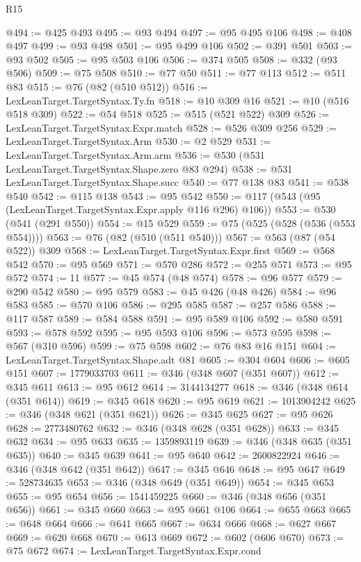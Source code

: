 \begin{lexlean}{R15}
\begin{coremodule}
{{{{{{{{{{{{{{{{{{{{{{{{{{{{{{{{{{{{{{{{{{{{{{{{{{{{{{{{{{{{{{{{{{{{{{@494 := @425 @493
@495 := @93 @494
@497 := @95 @495 @106
@498 := @408 @497
@499 := @93 @498
@501 := @95 @499 @106
@502 := @391 @501
@503 := @93 @502
@505 := @95 @503 @106
@506 := @374 @505
@508 := @332 (@93 @506)
@509 := @75 @508
@510 := @77 @50
@511 := @77 @113
@512 := @511 @83
@515 := @76 (@82 (@510 @512))
@516 := LexLeanTarget.TargetSyntax.Ty.fn
@518 := @10 @309 @16
@521 := @10 (@516 @518 @309)
@522 := @54 @518
@525 := @515 (@521 @522) @309
@526 := LexLeanTarget.TargetSyntax.Expr.match
@528 := @526 @309 @256
@529 := LexLeanTarget.TargetSyntax.Arm
@530 := @2 @529
@531 := LexLeanTarget.TargetSyntax.Arm.arm
@536 := @530 (@531 LexLeanTarget.TargetSyntax.Shape.zero @83 @294)
@538 := @531 LexLeanTarget.TargetSyntax.Shape.succ
@540 := @77 @138 @83
@541 := @538 @540
@542 := @115 @138
@543 := @95 @542
@550 := @117 (@543 (@95 (LexLeanTarget.TargetSyntax.Expr.apply @116 @296) @106))
@553 := @530 (@541 (@291 @550))
@554 := @15 @529
@559 := @75 (@525 (@528 (@536 (@553 @554))))
@563 := @76 (@82 (@510 (@511 @540)))
@567 := @563 (@87 (@54 @522)) @309
@568 := LexLeanTarget.TargetSyntax.Expr.first
@569 := @568 @542
@570 := @95 @569
@571 := @570 @286
@572 := @255 @571
@573 := @95 @572
@574 := 11
@577 := @45 @574 (@48 @574)
@578 := @96 @577
@579 := @290 @542
@580 := @95 @579
@583 := @45 @426 (@48 @426)
@584 := @96 @583
@585 := @570 @106
@586 := @295 @585
@587 := @257 @586
@588 := @117 @587
@589 := @584 @588
@591 := @95 @589 @106
@592 := @580 @591
@593 := @578 @592
@595 := @95 @593 @106
@596 := @573 @595
@598 := @567 (@310 @596)
@599 := @75 @598
@602 := @76 @83 @16 @151
@604 := LexLeanTarget.TargetSyntax.Shape.adt @81
@605 := @304 @604
@606 := @605 @151
@607 := 1779033703
@611 := @346 (@348 @607 (@351 @607))
@612 := @345 @611
@613 := @95 @612
@614 := 3144134277
@618 := @346 (@348 @614 (@351 @614))
@619 := @345 @618
@620 := @95 @619
@621 := 1013904242
@625 := @346 (@348 @621 (@351 @621))
@626 := @345 @625
@627 := @95 @626
@628 := 2773480762
@632 := @346 (@348 @628 (@351 @628))
@633 := @345 @632
@634 := @95 @633
@635 := 1359893119
@639 := @346 (@348 @635 (@351 @635))
@640 := @345 @639
@641 := @95 @640
@642 := 2600822924
@646 := @346 (@348 @642 (@351 @642))
@647 := @345 @646
@648 := @95 @647
@649 := 528734635
@653 := @346 (@348 @649 (@351 @649))
@654 := @345 @653
@655 := @95 @654
@656 := 1541459225
@660 := @346 (@348 @656 (@351 @656))
@661 := @345 @660
@663 := @95 @661 @106
@664 := @655 @663
@665 := @648 @664
@666 := @641 @665
@667 := @634 @666
@668 := @627 @667
@669 := @620 @668
@670 := @613 @669
@672 := @602 (@606 @670)
@673 := @75 @672
@674 := LexLeanTarget.TargetSyntax.Expr.cond
}}}}}}}}}}}}}}}}}}}}}}}}}}}}}}}}}}}}}}}}}}}}}}}}}}}}}}}}}}}}}}}}}}}}}}
\end{coremodule}
\end{lexlean}
